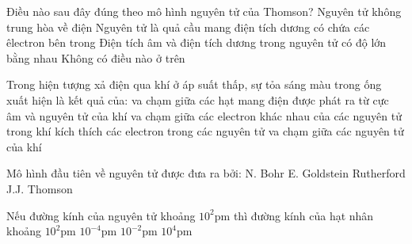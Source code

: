 \begin{ex}[2]
Điều nào sau đây đúng theo mô hình nguyên tử của Thomson?
\choice
{%
Nguyên tử không trung hòa về điện
}
{%
\True Nguyên tử là quả cầu mang điện tích dương có chứa các êlectron bên trong
}
{%
Điện tích âm và điện tích dương trong nguyên tử có độ lớn bằng nhau
}
 {%
 Không có điều nào ở trên
 }
\huongdan{
	
}
\end{ex}


\begin{ex}[3]
	Trong hiện tượng xả điện qua khí ở áp suất thấp, sự tỏa sáng màu trong ống xuất hiện là kết quả của:
	\choice
	{%
\True va chạm giữa các hạt mang điện được phát ra từ cực âm và nguyên tử của khí
	}
{%
	va chạm giữa các electron khác nhau của các nguyên tử trong khí
}
{%
	kích thích các electron trong các nguyên tử
}	
{%
va chạm giữa các nguyên tử của khí
}	
\huongdan{
	
}	
\end{ex}

\begin{ex}[2]
Mô hình đầu tiên về nguyên tử được đưa ra bởi:
\choice
{%
N. Bohr
}
{%
	E. Goldstein
}
{%
	Rutherford
}
{%
\True J.J. Thomson
}
\huongdan{
	
}
\end{ex}

\begin{ex}[2]
Nếu đường kính của nguyên tử khoảng $10^2 \mathrm{pm}$ thì đường kính của hạt nhân khoảng
\choice
{%
$10^2 \mathrm{pm}$
}
{%
$10^{-4} \mathrm{pm}$
}
{%
\True	$10^{-2} \mathrm{pm}$
}
{
$10^4 \mathrm{pm}$
}
\huongdan{
	
}
\end{ex}


